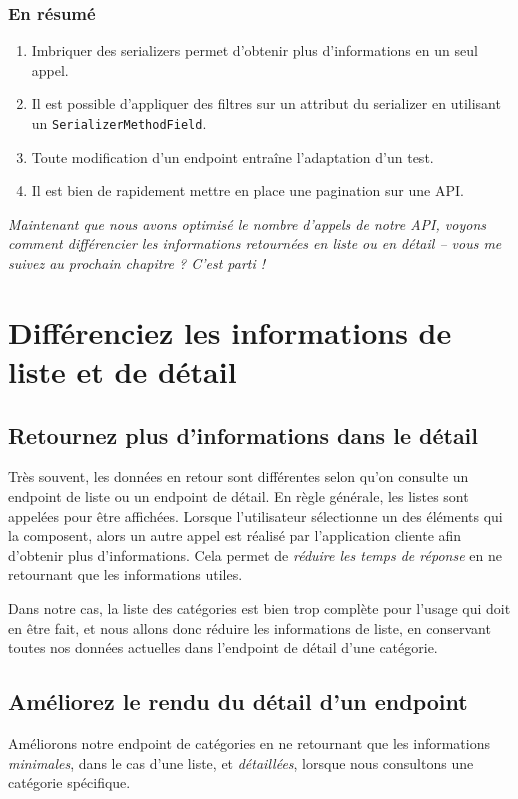 \documentclass[a4paper]{article}
\begin{document}
\subsubsection*{En résumé}
\begin{enumerate}
\item Imbriquer des serializers permet d’obtenir plus d’informations en un seul appel.
\item Il est possible d’appliquer des filtres sur un attribut du serializer en utilisant un {\tt SerializerMethodField}.
\item Toute modification d’un endpoint entraîne l’adaptation d’un test.
\item Il est bien de rapidement mettre en place une pagination sur une API.
\end{enumerate}

{\em Maintenant que nous avons optimisé le nombre d’appels de notre API, voyons comment différencier les informations retournées en liste ou en détail – vous me suivez au prochain chapitre ? C’est parti !}
\section{Différenciez les informations de liste et de détail}
\subsection{Retournez plus d’informations dans le détail}
Très souvent, les données en retour sont différentes selon qu’on consulte un endpoint de liste ou un endpoint de détail. En règle générale, les listes sont appelées pour être affichées. Lorsque l’utilisateur sélectionne un des éléments qui la composent, alors un autre appel est réalisé par l’application cliente afin d’obtenir plus d’informations. Cela permet de {\em réduire les temps de réponse} en ne retournant que les informations utiles.

Dans notre cas, la liste des catégories est bien trop complète pour l’usage qui doit en être fait, et nous allons donc réduire les informations de liste, en conservant toutes nos données actuelles dans l'endpoint de détail d’une catégorie.
\subsection{Améliorez le rendu du détail d’un endpoint}
Améliorons notre endpoint de catégories en ne retournant que les informations {\em minimales}, dans le cas d’une liste, et {\em détaillées}, lorsque nous consultons une catégorie spécifique.
\end{document}
